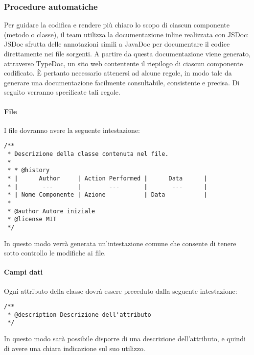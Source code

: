 \subsubsection{Procedure automatiche}
Per guidare la codifica e rendere più chiaro lo scopo di ciascun componente (metodo o classe), il team utilizza la documentazione inline realizzata con JSDoc: JSDoc sfrutta delle annotazioni simili a JavaDoc per documentare il codice direttamente nei file sorgenti. A partire da questa documentazione viene generato, attraverso TypeDoc, un sito web contentente il riepilogo di ciascun componente codificato. È pertanto necessario attenersi ad alcune regole, in modo tale da generare una documentazione facilmente consultabile, consistente e precisa. Di seguito verranno specificate tali regole.
\paragraph*{File}
I file dovranno avere la seguente intestazione:
\begin{verbatim}
/**
 * Descrizione della classe contenuta nel file.
 *
 * * @history
 * |      Author     | Action Performed |      Data      |
 * |       ---       |        ---       |       ---      |
 * | Nome Componente | Azione		    | Data		     |
 *
 * @author Autore iniziale
 * @license MIT
 */
\end{verbatim}
In questo modo verrà generata un'intestazione comune che consente di tenere sotto controllo le modifiche ai file.
\paragraph*{Campi dati}
Ogni attributo della classe dovrà essere preceduto dalla seguente intestazione:
\begin{verbatim}
/**
 * @description Descrizione dell'attributo
 */
\end{verbatim}
In questo modo sarà possibile disporre di una descrizione dell'attributo, e quindi di avere una chiara indicazione sul suo utilizzo.
